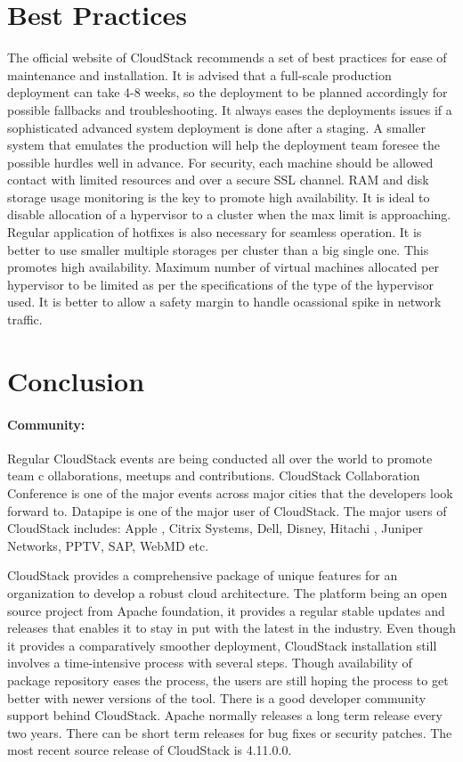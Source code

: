 \section{Best Practices}

The official website of CloudStack recommends a set of best practices for ease of 
maintenance and installation. It is advised that a full-scale production deployment 
can take 4-8 weeks, so the deployment to be planned accordingly for possible 
fallbacks and troubleshooting. It always eases the deployments issues if a sophisticated 
advanced system deployment is done after a staging. A smaller system that emulates the production 
 will help the deployment team foresee the possible hurdles well in advance. 
For security, each machine should be allowed contact 
with limited resources and over a secure SSL channel. RAM and disk storage usage monitoring 
is the key to promote high availability. It is ideal to disable allocation of a hypervisor
to a cluster when the max limit is approaching. Regular application of hotfixes is also necessary for 
seamless operation. It is better to use smaller multiple storages per cluster than a big single one.
This promotes high availability. Maximum number of virtual machines allocated per hypervisor to be limited as per the
specifications of the type of the hypervisor used. It is better to allow a safety margin to handle ocassional 
spike in network traffic. ~\cite{hid-sp18-417-www-cloudstack-best-practices}


\section{Conclusion}

\paragraph {Community:} 
Regular CloudStack events are being conducted all over the world to promote team c
ollaborations, meetups and contributions. CloudStack Collaboration Conference is 
one of the major events across major cities that the developers look forward to. 
Datapipe is one of the major user of CloudStack. The major users of CloudStack
includes: Apple , Citrix Systems, Dell, Disney, Hitachi , Juniper Networks, PPTV, SAP, 
WebMD etc. 

CloudStack provides a comprehensive package of unique features for an 
organization to develop a robust cloud architecture. The platform being an open source project
from Apache foundation, it provides a regular stable updates and releases that enables it to 
stay in put with the latest in the industry. Even though it provides a comparatively smoother deployment,
CloudStack installation still involves a time-intensive process with several steps. Though 
availability of package repository eases the process, the users are still 
hoping the process to get better with newer versions of the tool. 
There is a good developer community support
behind CloudStack. Apache normally releases a long term release every two years.
 There can be short term releases for bug fixes or security patches.
The most recent source release of CloudStack is 4.11.0.0.

